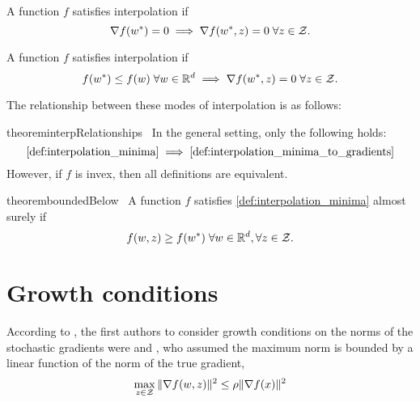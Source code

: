 \begin{definition}\label{def:interpolation_gradients}

    A function \( f \) satisfies interpolation if
    \[ \nabla f(w^*) = 0 \implies \nabla f(w^*, z) = 0 \; \forall z \in \mathcal{Z}. \]

\end{definition}

\begin{definition}\label{def:interpolation_minima_to_gradients}

    A function \( f \) satisfies interpolation if
    \[ f(w^*) \leq f(w) \; \forall w \in \mathbb{R}^d \implies \nabla f(w^*, z) = 0  \; \forall z \in \mathcal{Z}. \]

\end{definition}

The relationship between these modes of interpolation is as follows:
\begin{restatable}{theorem}{interpRelationships}~\label{thm:interp-relationships}
    In the general setting, only the following holds:
    \[ \autoref{def:interpolation_minima} \implies \autoref{def:interpolation_minima_to_gradients} \]
    However, if \( f \) is invex, then all definitions are equivalent.
\end{restatable}


\begin{restatable}{theorem}{boundedBelow}~\label{thm:bounded-below}
    A function \( f \) satisfies \autoref{def:interpolation_minima} almost surely if
    \[ f(w, z ) \geq f(w^*) \; \forall w \in \mathbb{R}^d, \forall z \in \mathcal{Z}. \]
\end{restatable}


\section{Growth conditions}\label{sec:growth_conditions}

According to \citet{schmidt2013fast}, the first authors to consider growth conditions on the norms of the stochastic gradients were \citet{tseng1998incremental} and
\citet{solodov1998incremental}, who assumed the maximum norm is bounded by a linear function of the norm of the true gradient,
\begin{align}
    \max_{z \in \mathcal{Z}} \|\nabla f(w, z)\|^2 \leq \rho \|\nabla f(x)\|^2 \label{eq:tseng_gc}
\end{align}

